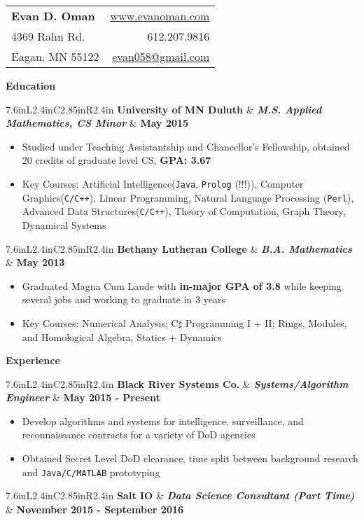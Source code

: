 \documentclass[letterpaper,10pt]{article}
\newcommand{\myitem}{\item[$\triangleright$]}
\newcommand{\resitem}[1]{\item[$\triangleright$] #1 

\vspace{-.1in}
}
\newcommand{\resheading}[1]{
	{
		\large\colorbox{mygrey}
		{
			\begin{minipage}{.98\textwidth}

			\centerline{\textbf{#1 \vphantom{p\^{E}}}}
			\end{minipage}
		}
	}
}
\newcommand{\rressubheading}[3]{
	\begin{tabular*}{7.6in}{L{2.4in}C{2.85in}R{2.4in}}
			\textbf{#1} & \textit{\textbf{#2}}  & \textbf{#3}
	\end{tabular*}\vspace{-12pt}
}
\begin{document}
	\begin{tabular*}{7.6in}{l@{\extracolsep{\fill}}r}
		\textbf{\Large Evan D. Oman}  &  \href{http://www.evanoman.com}{www.evanoman.com} \\
		4369 Rahn Rd. & 612.207.9816\\
		Eagan, MN 55122& \href{mailto:evan058@gmail.com}{evan058@gmail.com}\\
	\end{tabular*}
	\vspace{0.1in}
	\resheading{Education}
		\rressubheading{University of MN Duluth}{M.S. Applied Mathematics, CS Minor}{May 2015}
			\vspace{-.1in}
			\begin{itemize}
				\resitem{Studied under Teaching Assistantship and Chancellor's Fellowship, obtained 20 credits of graduate level CS, \textbf{GPA: 3.67}}
				\myitem Key Courses: Artificial Intelligence(\verb!Java!, \verb!Prolog! (!!!)), Computer Graphics(\verb!C/C++!), Linear Programming, Natural Language Processing (\verb!Perl!), Advanced Data Structures(\verb!C/C++!), Theory of Computation, Graph Theory, Dynamical Systems
			\end{itemize}
		\rressubheading{Bethany Lutheran College}{B.A. Mathematics}{May 2013}
			\vspace{-.1in}
			\begin{itemize}
				\resitem{Graduated Magna Cum Laude with \textbf{in-major GPA of 3.8} while keeping several jobs and working to graduate in 3 years}
				\resitem{Key Courses: Numerical Analysis; C$\sharp$ Programming I + II; Rings, Modules, and Homological Algebra, Statics + Dynamics}
			\end{itemize}
			\vspace{.1in}
	\resheading{Experience}
		\rressubheading{Black River Systems Co.}{Systems/Algorithm Engineer}{May 2015 - Present}
			\vspace{-.1in}
			\begin{itemize}
				\resitem{Develop algorithms and systems for intelligence, surveillance, and reconnaissance contracts for a variety of DoD agencies}
				\myitem Obtained Secret Level DoD clearance, time split between background research and \verb!Java/C/MATLAB! prototyping
			\end{itemize}
		\rressubheading{Salt IO}{Data Science Consultant (Part Time)}{November 2015 - September 2016}
			\vspace{-.1in}
\end{document}
